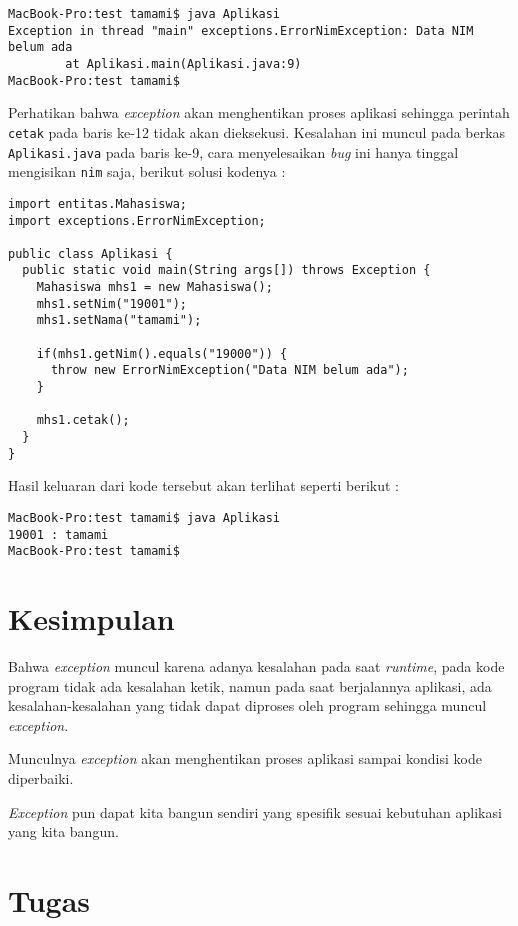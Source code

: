 \begin{lstlisting}
MacBook-Pro:test tamami$ java Aplikasi
Exception in thread "main" exceptions.ErrorNimException: Data NIM belum ada
        at Aplikasi.main(Aplikasi.java:9)
MacBook-Pro:test tamami$ 
\end{lstlisting}

Perhatikan bahwa \textit{exception} akan menghentikan proses aplikasi sehingga perintah \texttt{cetak} pada baris ke-12 tidak akan dieksekusi. Kesalahan ini muncul pada berkas \texttt{Aplikasi.java} pada baris ke-9, cara menyelesaikan \textit{bug} ini hanya tinggal mengisikan \texttt{nim} saja, berikut solusi kodenya :

\begin{lstlisting}
import entitas.Mahasiswa;
import exceptions.ErrorNimException;

public class Aplikasi {
  public static void main(String args[]) throws Exception {
    Mahasiswa mhs1 = new Mahasiswa();
    mhs1.setNim("19001");
    mhs1.setNama("tamami");

    if(mhs1.getNim().equals("19000")) {
      throw new ErrorNimException("Data NIM belum ada");
    }

    mhs1.cetak();
  }
}
\end{lstlisting}

Hasil keluaran dari kode tersebut akan terlihat seperti berikut :

\begin{lstlisting}
MacBook-Pro:test tamami$ java Aplikasi
19001 : tamami
MacBook-Pro:test tamami$ 
\end{lstlisting}

\section{Kesimpulan}

Bahwa \textit{exception} muncul karena adanya kesalahan pada saat \textit{runtime}, pada kode program tidak ada kesalahan ketik, namun pada saat berjalannya aplikasi, ada kesalahan-kesalahan yang tidak dapat diproses oleh program sehingga muncul \textit{exception}.

Munculnya \textit{exception} akan menghentikan proses aplikasi sampai kondisi kode diperbaiki.

\textit{Exception} pun dapat kita bangun sendiri yang spesifik sesuai kebutuhan aplikasi yang kita bangun.

\section{Tugas}

